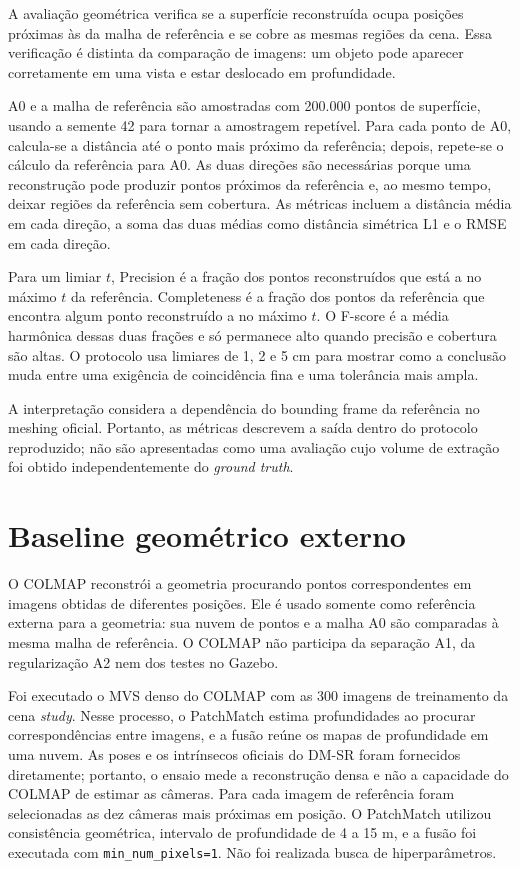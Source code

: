 A avaliação geométrica verifica se a superfície reconstruída ocupa posições próximas às da malha de referência e se cobre as mesmas regiões da cena. Essa verificação é distinta da comparação de imagens: um objeto pode aparecer corretamente em uma vista e estar deslocado em profundidade.

A0 e a malha de referência são amostradas com 200.000 pontos de superfície, usando a semente 42 para tornar a amostragem repetível. Para cada ponto de A0, calcula-se a distância até o ponto mais próximo da referência; depois, repete-se o cálculo da referência para A0. As duas direções são necessárias porque uma reconstrução pode produzir pontos próximos da referência e, ao mesmo tempo, deixar regiões da referência sem cobertura. As métricas incluem a distância média em cada direção, a soma das duas médias como distância simétrica L1 e o RMSE em cada direção.

Para um limiar $t$, Precision é a fração dos pontos reconstruídos que está a no máximo $t$ da referência. Completeness é a fração dos pontos da referência que encontra algum ponto reconstruído a no máximo $t$. O F-score é a média harmônica dessas duas frações e só permanece alto quando precisão e cobertura são altas. O protocolo usa limiares de 1, 2 e 5 cm para mostrar como a conclusão muda entre uma exigência de coincidência fina e uma tolerância mais ampla.

A interpretação considera a dependência do bounding frame da referência no meshing oficial. Portanto, as métricas descrevem a saída dentro do protocolo reproduzido; não são apresentadas como uma avaliação cujo volume de extração foi obtido independentemente do \textit{ground truth}.

\section{Baseline geométrico externo}

O COLMAP reconstrói a geometria procurando pontos correspondentes em imagens obtidas de diferentes posições. Ele é usado somente como referência externa para a geometria: sua nuvem de pontos e a malha A0 são comparadas à mesma malha de referência. O COLMAP não participa da separação A1, da regularização A2 nem dos testes no Gazebo.

Foi executado o MVS denso do COLMAP \citep{schonberger2016mvs} com as 300 imagens de treinamento da cena \textit{study}. Nesse processo, o PatchMatch estima profundidades ao procurar correspondências entre imagens, e a fusão reúne os mapas de profundidade em uma nuvem. As poses e os intrínsecos oficiais do DM-SR foram fornecidos diretamente; portanto, o ensaio mede a reconstrução densa e não a capacidade do COLMAP de estimar as câmeras. Para cada imagem de referência foram selecionadas as dez câmeras mais próximas em posição. O PatchMatch utilizou consistência geométrica, intervalo de profundidade de 4 a 15 m, e a fusão foi executada com \texttt{min\_num\_pixels=1}. Não foi realizada busca de hiperparâmetros.

